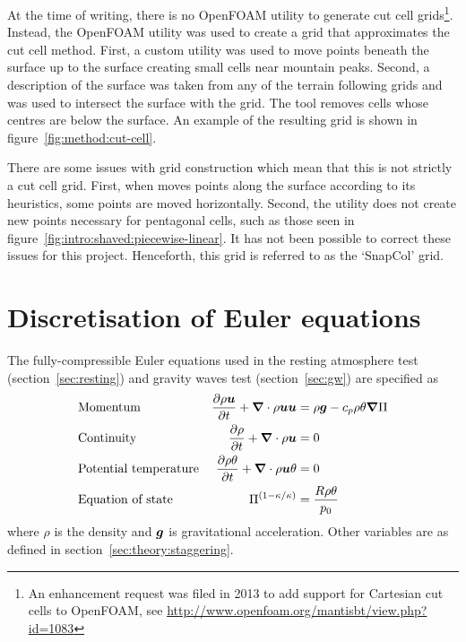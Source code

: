 At the time of writing, there is no OpenFOAM utility to generate cut cell grids\footnote{An enhancement request was filed in 2013 to add support for Cartesian cut cells to OpenFOAM, see \url{http://www.openfoam.org/mantisbt/view.php?id=1083}}.  Instead, the OpenFOAM utility  was used to create a grid that approximates the cut cell method.  First, a custom utility was used to move points beneath the surface up to the surface creating small cells near mountain peaks.  Second, a description of the surface was taken from any of the terrain following grids and  was used to intersect the surface with the grid.  The tool removes cells whose centres are below the surface.  An example of the resulting grid is shown in figure~\ref{fig:method:cut-cell}.

There are some issues with grid construction which mean that this is not strictly a cut cell grid.  First, when  moves points along the surface according to its heuristics, some points are moved horizontally.  Second, the utility does not create new points necessary for pentagonal cells, such as those seen in figure~\ref{fig:intro:shaved:piecewise-linear}.  It has not been possible to correct these issues for this project.  Henceforth, this grid is referred to as the `SnapCol' grid.


\section{Discretisation of Euler equations}
\label{sec:method:discretisation}

The fully-compressible Euler equations used in the resting atmosphere test (section~\ref{sec:resting}) and gravity waves test (section~\ref{sec:gw}) are specified as
\begin{subequations}
\begin{align}
& \text{Momentum} & \frac{\partial \rho \vect{u}}{\partial t} + \del \cdot \rho \vect{u} \vect{u} &= \rho \vect{g} - c_p \rho \theta \del \exner \label{eqn:method:momentum} \\
%
& \text{Continuity} & \frac{\partial \rho}{\partial t} + \del \cdot \rho \vect{u} &= 0 \label{eqn:method:continuity} \\
%
& \text{Potential temperature} & \frac{\partial \rho \theta}{\partial t} + \del \cdot \rho \vect{u} \theta &= 0 \\
%
& \text{Equation of state} & \exner^{(1 - \kappa / \kappa)} &= \frac{R \rho \theta}{p_0}
\end{align}
\end{subequations}
where $\rho$ is the density and $\bm{g}$ is gravitational acceleration.  Other variables are as defined in section~\ref{sec:theory:staggering}.

